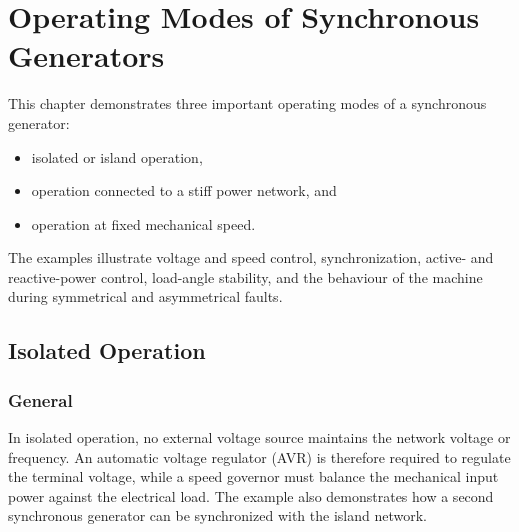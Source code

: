 
\chapter{Operating Modes of Synchronous Generators}
\label{chap:synchronous-generator-operating-modes}

This chapter demonstrates three important operating modes of a synchronous
generator:

\begin{itemize}
  \item isolated or island operation,
  \item operation connected to a stiff power network, and
  \item operation at fixed mechanical speed.
\end{itemize}

The examples illustrate voltage and speed control, synchronization, active-
and reactive-power control, load-angle stability, and the behaviour of the
machine during symmetrical and asymmetrical faults.

\section{Isolated Operation}
\label{sec:sg-isolated-operation}

\subsection{General}

In isolated operation, no external voltage source maintains the network
voltage or frequency. An automatic voltage regulator (AVR) is therefore
required to regulate the terminal voltage, while a speed governor must balance
the mechanical input power against the electrical load. The example also
demonstrates how a second synchronous generator can be synchronized with the
island network.

